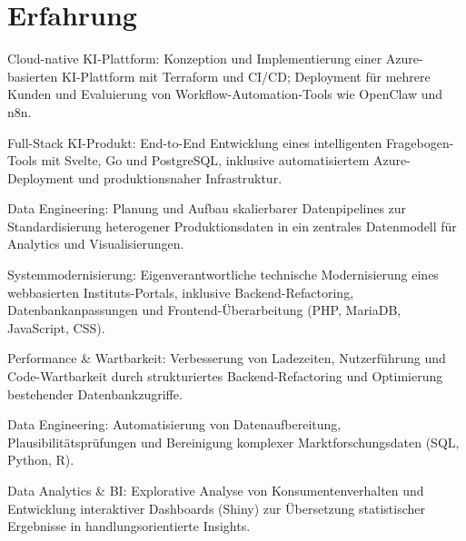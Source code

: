 \documentclass[letterpaper]{deedy-resume} %
\begin{document}
\begin{minipage}[t]{0.66\textwidth} %


\section{Erfahrung}

\vspace{\topsep}
\begin{tightitemize}
\item Cloud-native KI-Plattform: Konzeption und Implementierung einer Azure-basierten KI-Plattform mit Terraform und CI/CD; Deployment für mehrere Kunden und Evaluierung von Workflow-Automation-Tools wie OpenClaw und n8n.
\item Full-Stack KI-Produkt: End-to-End Entwicklung eines intelligenten Fragebogen-Tools mit Svelte, Go und PostgreSQL, inklusive automatisiertem Azure-Deployment und produktionsnaher Infrastruktur.
\item Data Engineering: Planung und Aufbau skalierbarer Datenpipelines zur Standardisierung heterogener Produktionsdaten in ein zentrales Datenmodell für Analytics und Visualisierungen.
\end{tightitemize}
\sectionspace

\begin{tightitemize}
\item Systemmodernisierung: Eigenverantwortliche technische Modernisierung eines webbasierten Instituts-Portals, inklusive Backend-Refactoring, Datenbankanpassungen und Frontend-Überarbeitung (PHP, MariaDB, JavaScript, CSS).
\item Performance \& Wartbarkeit: Verbesserung von Ladezeiten, Nutzerführung und Code-Wartbarkeit durch strukturiertes Backend-Refactoring und Optimierung bestehender Datenbankzugriffe.
\end{tightitemize}
\sectionspace

\begin{tightitemize}
\item Data Engineering: Automatisierung von Datenaufbereitung, Plausibilitätsprüfungen und Bereinigung komplexer Marktforschungsdaten (SQL, Python, R).
\item Data Analytics \& BI: Explorative Analyse von Konsumentenverhalten und Entwicklung interaktiver Dashboards (Shiny) zur Übersetzung statistischer Ergebnisse in handlungsorientierte Insights.
\end{tightitemize}
\sectionspace


\end{minipage}
\end{document}
